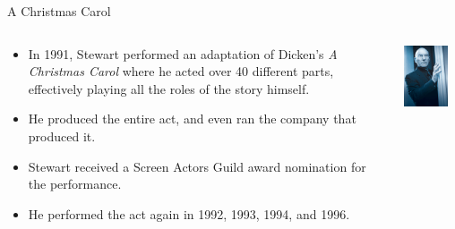 \documentclass[xcolor=dvipsnames]{beamer}
\begin{document}
\begin{frame}{A Christmas Carol}
  \begin{columns}
    \begin{column}{0.7\textwidth}
      \begin{itemize}
        \item In 1991, Stewart performed an adaptation of Dicken's \emph{A Christmas
        Carol} where he acted over 40 different parts, effectively playing all
        the roles of the story himself.
        \item He produced the entire act, and even ran the company that produced
        it.
        \item Stewart received a Screen Actors Guild award nomination for the
        performance.
        \item He performed the act again in 1992, 1993, 1994, and 1996.
      \end{itemize}
    \end{column}
    \begin{column}{0.3\textwidth}
      \includegraphics[width=0.8\textwidth]{xmascarol.png} \newline

\end{column}
\end{columns}
\end{frame}
\end{document}
